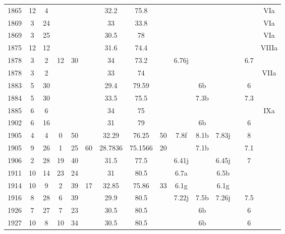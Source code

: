 \begin{flushleft}
\begin{longtable}{|c|c|c|c|c|c|c|c|c|c|c|c|c|c|c|}
1865 & 12 & 4  &    &    &    & 32.2    & 75.8    &      &       &      &       &      &      & VIa    \\
1869 & 3  & 24 &    &    &    & 33      & 33.8    &      &       &      &       &      &      & VIa    \\
1869 & 3  & 25 &    &    &    & 30.5    & 78      &      &       &      &       &      &      & VIa    \\
1875 & 12 & 12 &    &    &    & 31.6    & 74.4    &      &       &      &       &      &      & VIIIa  \\
1878 & 3  & 2  & 12 & 30 &    & 34      & 73.2    &      & 6.76j &      &       &      & 6.7  &        \\
1878 & 3  & 2  &    &    &    & 33      & 74      &      &       &      &       &      &      & VIIa   \\
1883 & 5  & 30 &    &    &    & 29.4    & 79.59   &      &       & 6b   &       &      & 6    &        \\
1884 & 5  & 30 &    &    &    & 33.5    & 75.5    &      &       & 7.3b &       &      & 7.3  &        \\
1885 & 6  & 6  &    &    &    & 34      & 75      &      &       &      &       &      &      & IXa    \\
1902 & 6  & 16 &    &    &    & 31      & 79      &      &       & 6b   &       &      & 6    &        \\
1905 & 4  & 4  & 0  & 50 &    & 32.29   & 76.25   & 50   & 7.8f  & 8.1b & 7.83j &      & 8    &        \\
1905 & 9  & 26 & 1  & 25 & 60 & 28.7836 & 75.1566 & 20   &       & 7.1b &       &      & 7.1  &        \\
1906 & 2  & 28 & 19 & 40 &    & 31.5    & 77.5    &      & 6.41j &      & 6.45j &      & 7    &        \\
1911 & 10 & 14 & 23 & 24 &    & 31      & 80.5    &      & 6.7a  &      & 6.5b  &      &      &        \\
1914 & 10 & 9  & 2  & 39 & 17 & 32.85   & 75.86   & 33   & 6.1g  &      & 6.1g  &      &      &        \\
1916 & 8  & 28 & 6  & 39 &    & 29.9    & 80.5    &      & 7.22j & 7.5b & 7.26j &      & 7.5  &        \\
1926 & 7  & 27 & 7  & 23 &    & 30.5    & 80.5    &      &       & 6b   &       &      & 6    &        \\
1927 & 10 & 8  & 10 & 34 &    & 30.5    & 80.5    &      &       & 6b   &       &      & 6    &        \\

\end{longtable}
\end{flushleft}
